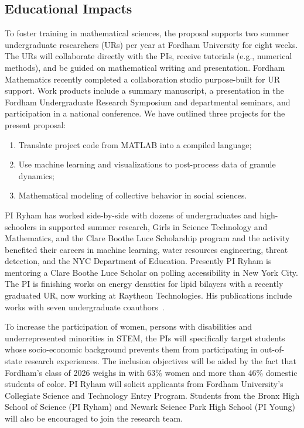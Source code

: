 \subsection{Educational Impacts}
\label{subsec:Educational_plans}
To foster training in mathematical sciences, the proposal supports two
summer undergraduate researchers (URs) per year at Fordham University for
eight weeks. The URs will collaborate directly with the PIs,
receive tutorials (e.g., numerical methods), and be guided on
mathematical writing and presentation. Fordham Mathematics recently
completed a collaboration studio purpose-built for UR support. Work
products include a summary manuscript, a presentation in the Fordham
Undergraduate Research Symposium and departmental seminars, and
participation in a national conference. We have outlined three projects
for the present proposal:
\begin{enumerate}[noitemsep,topsep=0pt]
  \item Translate project code from MATLAB into a compiled language;
  \item Use machine learning and visualizations to post-process data of
    granule dynamics;
  \item Mathematical modeling of collective behavior in social sciences.
\end{enumerate}
PI Ryham has worked side-by-side with dozens of undergraduates and
high-schoolers in supported summer research, Girls in Science Technology
and Mathematics, and the Clare Boothe Luce Scholarship program and the
activity benefited their careers in machine learning, water resources
engineering, threat detection, and the NYC Department of Education.
Presently PI Ryham is mentoring a Clare Boothe Luce Scholar on polling
accessibility in New York City. The PI is finishing works on energy
densities for lipid bilayers with a recently graduated UR, now working
at Raytheon Technologies. His publications include works with seven
undergraduate coauthors~\cite{Figueroa2012CuttingCI, RYHAM20112929,
RyWaCo13, RyKlYaCo16}.

To increase the participation of women, persons with disabilities and
underrepresented minorities in STEM, the PIs will specifically target
students whose socio-economic background prevents them from
participating in out-of-state research experiences. The inclusion
objectives will be aided by the fact that Fordham's class of 2026 weighs
in with 63\% women and more than 46\% domestic students of color. PI
Ryham will solicit applicants from Fordham University's Collegiate
Science and Technology Entry Program. Students from the Bronx High
School of Science (PI Ryham) and Newark Science Park High School (PI
Young) will also be encouraged to join the research team. 

